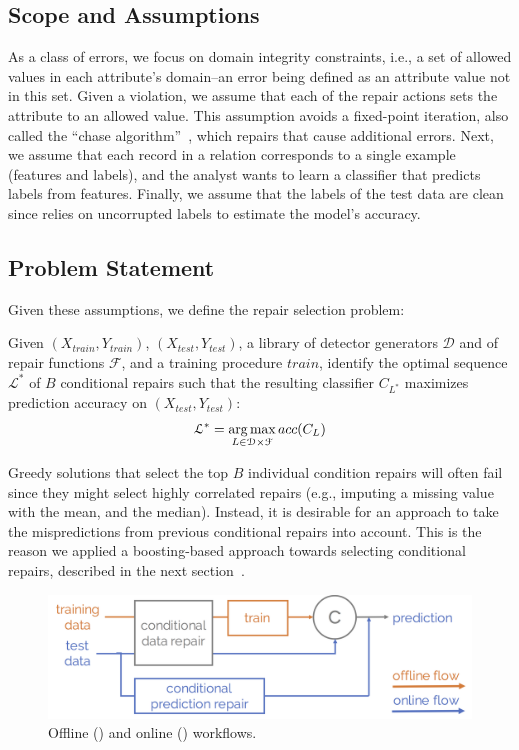 \subsection{Scope and Assumptions}
As a class of errors, we focus on domain integrity constraints, i.e., a set of allowed values in each attribute's domain--an error being defined as an attribute value not in this set.
Given a violation, we assume that each of the repair actions sets the attribute to an allowed value.
This assumption avoids a fixed-point iteration, also called the ``chase algorithm''~\cite{aho1979theory}, which repairs that cause additional errors.
Next, we assume that each record in a relation corresponds to a single example (features and labels), and the analyst wants to learn a classifier that predicts labels from features.
Finally, we assume that the labels of the test data are clean since \sys relies on uncorrupted labels to estimate the model's accuracy.

\subsection{Problem Statement}
Given these assumptions, we define the repair selection problem:

\begin{problem}\sloppy
Given $(X_{train}, Y_{train})$, $(X_{test}, Y_{test})$, a library of detector generators $\mathcal{D}$ and of repair functions $\mathcal{F}$, and a training procedure $train$, identify the optimal sequence $\mathcal{L}^*$ of $B$ conditional repairs such that the resulting classifier $C_{L^*}$  maximizes prediction accuracy on $(X_{test}, Y_{test})$:
$$\mathcal{L}^* = \operatorname*{arg\,max}_{L \in \mathcal{D}\times\mathcal{F}} acc(C_L)$$
\end{problem}

Greedy solutions that select the top $B$ individual condition repairs will often fail since they might select highly correlated repairs (e.g., imputing a missing value with the mean, and the median).
Instead, it is desirable for an approach to take the mispredictions from previous conditional repairs into account.  This is the reason we applied a boosting-based approach towards selecting conditional repairs, described in the next section~\cite{schapire2003boosting}.

\begin{figure}\centering
\includegraphics[width=\columnwidth]{figures/workflow.png}
\caption{Offline () and online () workflows.}
\label{fig:workflow}
\end{figure}

